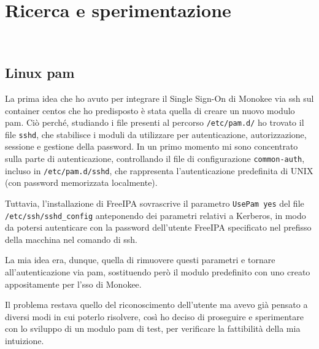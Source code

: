 
\chapter{Ricerca e sperimentazione}
\label{cap:ricerca-sperimentazione}

\\

\section{Linux \acrshort{pam}}
\label{sec:tecnologie-strumenti}

La prima idea che ho avuto per integrare il Single Sign-On di Monokee via \acrshort{ssh} sul container \acrshort{centos} che ho predisposto è stata quella di creare un nuovo modulo \acrshort{pam}. Ciò perché, studiando i file presenti al percorso \texttt{/etc/pam.d/} ho trovato il file \texttt{sshd}, che stabilisce i moduli da utilizzare per autenticazione, autorizzazione, sessione e gestione della password. In un primo momento mi sono concentrato sulla parte di autenticazione, controllando il file di configurazione \texttt{common-auth}, incluso in \texttt{/etc/pam.d/sshd}, che rappresenta l'autenticazione predefinita di UNIX (con password memorizzata localmente). 

Tuttavia, l'installazione di FreeIPA sovrascrive il parametro \texttt{UsePam yes} del file \texttt{/etc/ssh/sshd\_config} anteponendo dei parametri relativi a Kerberos, in modo da potersi autenticare con la password dell'utente FreeIPA specificato nel prefisso della macchina nel comando di \acrshort{ssh}.

La mia idea era, dunque, quella di rimuovere questi parametri e tornare all'autenticazione via \acrshort{pam}, sostituendo però il modulo predefinito con uno creato appositamente per l'\acrshort{sso} di Monokee.

Il problema restava quello del riconoscimento dell'utente ma avevo già pensato a diversi modi in cui poterlo risolvere, così ho deciso di proseguire e sperimentare con lo sviluppo di un modulo \acrshort{pam} di test, per verificare la fattibilità della mia intuizione.

